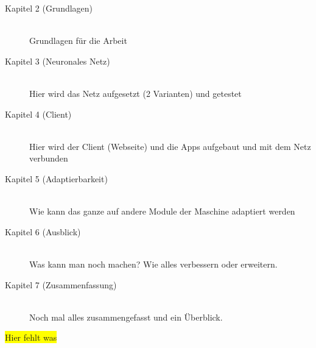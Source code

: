 \begin{description}

    \item[Kapitel 2 (Grundlagen)]\hfill \\
    Grundlagen für die Arbeit

    \item[Kapitel 3 (Neuronales Netz)]\hfill \\
    Hier wird das Netz aufgesetzt (2 Varianten) und getestet

    \item[Kapitel 4 (Client)]\hfill \\
    Hier wird der Client (Webseite) und die Apps aufgebaut und mit dem Netz verbunden

    \item[Kapitel 5 (Adaptierbarkeit)]\hfill \\
    Wie kann das ganze auf andere Module der Maschine adaptiert werden

    \item[Kapitel 6 (Ausblick)]\hfill \\
    Was kann man noch machen? Wie alles verbessern oder erweitern.

    \item[Kapitel 7 (Zusammenfassung)]\hfill \\
    Noch mal alles zusammengefasst und ein Überblick.

\end{description}

\colorbox{yellow}{Hier fehlt was}